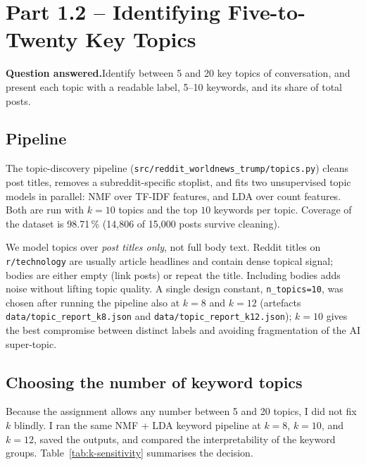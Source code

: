 \documentclass[11pt,a4paper]{article}
\newenvironment{designbox}{%
  \par\medskip\noindent
  \def\FrameCommand{\fboxsep=6pt\fboxrule=0.4pt%
    \fcolorbox{designboxrule}{designboxbg}}%
  \MakeFramed{\advance\hsize-2\fboxsep\FrameRestore}%
  \noindent{\sffamily\bfseries Design choice.}\quad\ignorespaces%
}{\endMakeFramed\par\medskip}
\newcommand{\questionanswered}[1]{%
  \par\medskip\noindent\textbf{Question answered.}\quad #1\par\medskip%
}
\begin{document}
\section{Part 1.2 -- Identifying Five-to-Twenty Key Topics}
\label{sec:12}

\questionanswered{Identify between 5 and 20 key topics of conversation, and present each topic
with a readable label, 5--10 keywords, and its share of total posts.}

\subsection{Pipeline}
The topic-discovery pipeline (\texttt{src/reddit\_worldnews\_trump/topics.py}) cleans post titles,
removes a subreddit-specific stoplist, and fits two unsupervised topic models in parallel:
NMF over TF-IDF features, and LDA over count features. Both are run with \(k=10\) topics and the
top \(10\) keywords per topic. Coverage of the dataset is 98.71\,\% (14{,}806 of 15{,}000 posts
survive cleaning).

\begin{designbox}
We model topics over \emph{post titles only}, not full body text. Reddit titles on
\texttt{r/technology} are usually article headlines and contain dense topical signal; bodies are
either empty (link posts) or repeat the title. Including bodies adds noise without lifting topic
quality. A single design constant, \texttt{n\_topics=10}, was chosen after running the pipeline
also at $k=8$ and $k=12$ (artefacts \texttt{data/topic\_report\_k8.json} and
\texttt{data/topic\_report\_k12.json}); $k=10$ gives the best compromise between distinct labels
and avoiding fragmentation of the AI super-topic.
\end{designbox}

\subsection{Choosing the number of keyword topics}

Because the assignment allows any number between 5 and 20 topics, I did not fix \(k\) blindly.
I ran the same NMF + LDA keyword pipeline at \(k=8\), \(k=10\), and \(k=12\), saved the outputs,
and compared the interpretability of the keyword groups. Table~\ref{tab:k-sensitivity} summarises
the decision.
\end{document}
